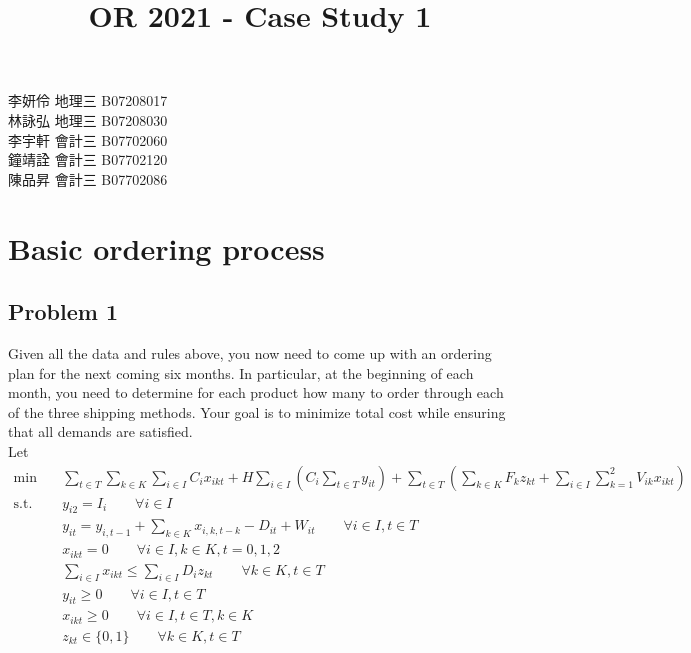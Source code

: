 \documentclass[12pt,a4paper]{article}
\title{OR 2021 - Case Study 1}
\begin{document}
\maketitle
\begin{CJK}{UTF8}{bsmi}
\begin{flushright}
李妍伶 地理三 B07208017\\
林詠弘 地理三 B07208030\\
李宇軒 會計三 B07702060\\
鐘靖詮 會計三 B07702120\\
陳品昇 會計三 B07702086\\
\end{flushright}
\end{CJK}
\fontsize{12}{20pt}\selectfont

\section{Basic ordering process}
\subsection*{Problem 1}

Given all the data and rules above, you now need to come up with an ordering plan for
the next coming six months. In particular, at the beginning of each month, you need
to determine for each product how many to order through each of the three shipping
methods. Your goal is to minimize total cost while ensuring that all demands are satisfied.\\

Let\\

\begin{equation*}
\begin{aligned}
\mbox{min} \quad &\sum_{t \in T}\sum_{k \in K}\sum_{i \in I}C_ix_{ikt} + H\sum_{i \in I}(C_i\sum_{t \in T}y_{it}) + \sum_{t\in T}^{}(\sum_{k\in K}^{}F_kz_{kt}+ \sum_{i \in I}^{}\sum_{k=1}^{2} V_{ik}x_{ikt})\\ 
\mbox{s.t.} \quad 
&y_{i2} = I_{i}\qquad\forall i \in I\\
&y_{it} = y_{i,t-1} + \sum_{k \in K}^{} x_{i,k,t-k} - D_{it} + W_{it}\qquad \forall i \in I, t \in T\\
&x_{ikt} = 0\qquad\forall i \in I, k \in K,t=0,1,2\\
&\sum_{i \in I}^{} x_{ikt} \leq \sum_{i \in I}^{}D_{i}z_{kt} \qquad \forall k \in K, t \in T\\
&y_{it} \geq 0 \qquad \forall i \in I, t \in T\\
&x_{ikt} \geq 0 \qquad \forall i \in I, t \in T, k \in K\\
&z_{kt} \in \{0, 1\} \qquad \forall k \in K, t \in T\\
\end{aligned}
\end{equation*}
\end{document}
